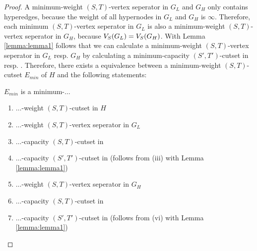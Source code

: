 \begin{proof}
A minimum-weight $(S,T)$-vertex seperator in $G_L$ and $G_H$ only contains hyperedges, because
the weight of all hypernodes in $G_L$ and $G_H$ is $\infty$. Therefore, each minimum
$(S,T)$-vertex seperator in $G_L$ is also a minimum-weight $(S,T)$-vertex seperator in $G_H$,
because $V_S(G_L) = V_S(G_H)$. With Lemma \ref{lemma:lemma1} follows that we can calculate
a minimum-weight $(S,T)$-vertex seperator in $G_L$ resp. $G_H$ by calculating a minimum-capacity
$(S',T')$-cutset in  resp. . Therefore, there exists a equivalence
between a minimum-weight $(S,T)$-cutset $E_{min}$ of $H$ and the following statements: 

$E_{min}$ is a minimum-$\ldots$
\begin{enumerate}
\item $\ldots$-weight $(S,T)$-cutset in $H$
\item $\ldots$-weight $(S,T)$-vertex seperator in $G_L$
\item $\ldots$-capacity $(S,T)$-cutset in 
\item $\ldots$-capacity $(S',T')$-cutset in  (follows from (iii) with Lemma \ref{lemma:lemma1})
\item $\ldots$-weight $(S,T)$-vertex seperator in $G_H$
\item $\ldots$-capacity $(S,T)$-cutset in 
\item $\ldots$-capacity $(S',T')$-cutset in  (follows from (vi) with Lemma \ref{lemma:lemma1})
\end{enumerate}


\end{proof}
